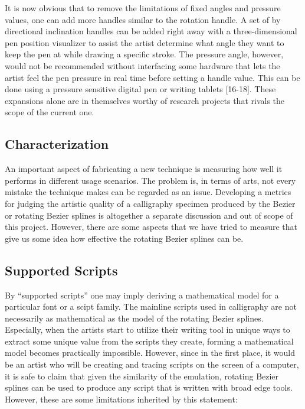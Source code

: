 It is now obvious that to remove the limitations of fixed angles and pressure values, one can add more handles similar to the rotation handle. A set of by directional inclination handles can be added right away with a three-dimensional pen position visualizer to assist the artist determine what angle they want to keep the pen at while drawing a specific stroke. The pressure angle, however, would not be recommended without interfacing some hardware that lets the artist feel the pen pressure in real time before setting a handle value. This can be done using a pressure sensitive digital pen or writing tablets [16-18]. These expansions alone are in themselves worthy of research projects that rivals the scope of the current one.

\subsection{Characterization}
An important aspect of fabricating a new technique is measuring how well it performs in different usage scenarios. The problem is, in terms of arts, not every mistake the technique makes can be regarded as an issue. Developing a metrics for judging the artistic quality of a calligraphy specimen produced by the Bezier or rotating Bezier splines is altogether a separate discussion and out of scope of this project. However, there are some aspects that we have tried to measure that give us some idea how effective the rotating Bezier splines can be.

\subsection{Supported Scripts}
By ``supported scripts'' one may imply deriving a mathematical model for a particular font or a scipt family. The mainline scripts used in calligraphy are not necessarily as mathematical as the model of the rotating Bezier splines. Especially, when the artists start to utilize their writing tool in unique ways to extract some unique value from the scripts they create, forming a mathematical model becomes practically impossible. However, since in the first place, it would be an artist who will be creating and tracing scripts on the screen of a computer, it is safe to claim that given the similarity of the emulation, rotating Bezier splines can be used to produce any script that is written with broad edge tools. However, these are some limitations inherited by this statement:

